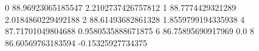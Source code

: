 0 88.96923065185547 2.2102737426757812
1 88.7774429321289 2.0184860229492188
2 88.61493682861328 1.8559799194335938
4 87.71701049804688 0.9580535888671875
6 86.75895690917969 0.0
8 86.60569763183594 -0.15325927734375
